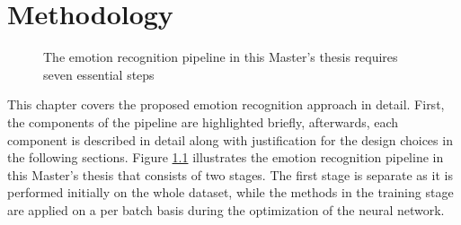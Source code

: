 \chapter{Methodology}

\begin{figure}[H]
  \begin{center}
  \caption[Emotion recognition pipeline]{The emotion recognition pipeline in this Master's thesis requires seven essential steps}
  \label{fig:MachineLearningModelMethods}
  \end{center}
\end{figure}

This chapter covers the proposed emotion recognition approach in detail. First, the components of the pipeline are highlighted briefly, afterwards, each component is described in detail along with justification for the design choices in the following sections. 
\newline\newline
Figure \ref{fig:MachineLearningModelMethods} illustrates the emotion recognition pipeline in this Master's thesis that consists of two stages. The first stage is separate as it is performed initially on the whole dataset, while the methods in the training stage are applied on a per batch basis during the optimization of the neural network.

